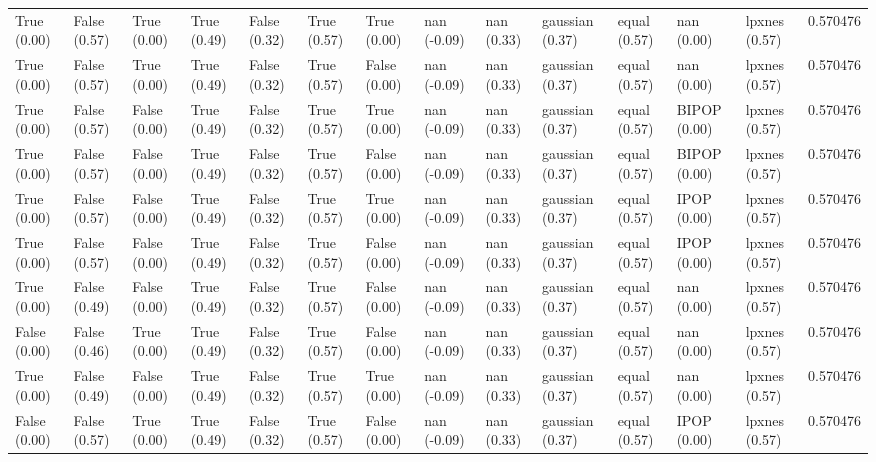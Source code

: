 \begin{tabular}{lllllllllllllr}
True (0.00) & False (0.57) & True (0.00) & True (0.49) & False (0.32) & True (0.57) & True (0.00) & nan (-0.09) & nan (0.33) & gaussian (0.37) & equal (0.57) & nan (0.00) & lpxnes (0.57) & 0.570476 \\
True (0.00) & False (0.57) & True (0.00) & True (0.49) & False (0.32) & True (0.57) & False (0.00) & nan (-0.09) & nan (0.33) & gaussian (0.37) & equal (0.57) & nan (0.00) & lpxnes (0.57) & 0.570476 \\
True (0.00) & False (0.57) & False (0.00) & True (0.49) & False (0.32) & True (0.57) & True (0.00) & nan (-0.09) & nan (0.33) & gaussian (0.37) & equal (0.57) & BIPOP (0.00) & lpxnes (0.57) & 0.570476 \\
True (0.00) & False (0.57) & False (0.00) & True (0.49) & False (0.32) & True (0.57) & False (0.00) & nan (-0.09) & nan (0.33) & gaussian (0.37) & equal (0.57) & BIPOP (0.00) & lpxnes (0.57) & 0.570476 \\
True (0.00) & False (0.57) & False (0.00) & True (0.49) & False (0.32) & True (0.57) & True (0.00) & nan (-0.09) & nan (0.33) & gaussian (0.37) & equal (0.57) & IPOP (0.00) & lpxnes (0.57) & 0.570476 \\
True (0.00) & False (0.57) & False (0.00) & True (0.49) & False (0.32) & True (0.57) & False (0.00) & nan (-0.09) & nan (0.33) & gaussian (0.37) & equal (0.57) & IPOP (0.00) & lpxnes (0.57) & 0.570476 \\
True (0.00) & False (0.49) & False (0.00) & True (0.49) & False (0.32) & True (0.57) & False (0.00) & nan (-0.09) & nan (0.33) & gaussian (0.37) & equal (0.57) & nan (0.00) & lpxnes (0.57) & 0.570476 \\
False (0.00) & False (0.46) & True (0.00) & True (0.49) & False (0.32) & True (0.57) & False (0.00) & nan (-0.09) & nan (0.33) & gaussian (0.37) & equal (0.57) & nan (0.00) & lpxnes (0.57) & 0.570476 \\
True (0.00) & False (0.49) & False (0.00) & True (0.49) & False (0.32) & True (0.57) & True (0.00) & nan (-0.09) & nan (0.33) & gaussian (0.37) & equal (0.57) & nan (0.00) & lpxnes (0.57) & 0.570476 \\
False (0.00) & False (0.57) & True (0.00) & True (0.49) & False (0.32) & True (0.57) & False (0.00) & nan (-0.09) & nan (0.33) & gaussian (0.37) & equal (0.57) & IPOP (0.00) & lpxnes (0.57) & 0.570476 \\
\bottomrule
\end{tabular}
